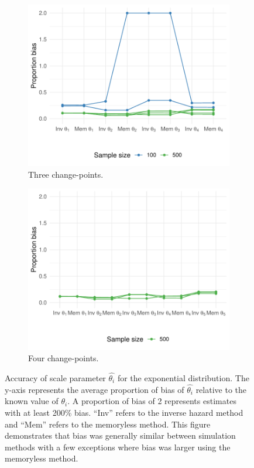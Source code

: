 \begin{appendix}
\begin{figure}[ht]
     \begin{subfigure}[b]{0.45\textwidth}
         \centering
         \includegraphics[width=\textwidth]{exp3_tplot.pdf}
         \caption{Three change-points.}
         \label{fig:exp3tplot}
     \end{subfigure}
     \hfill
     \begin{subfigure}[b]{0.45\textwidth}
         \centering
         \includegraphics[width=\textwidth]{exp4_tplot.pdf}
         \caption{Four change-points.}
         \label{fig:exp4tplot}
     \end{subfigure}
    \caption{Accuracy of scale parameter $\hat{\theta_i}$ for the exponential distribution. The y-axis represents the average proportion of bias of $\hat{\theta_i}$ relative to the known value of $\theta_i$. A proportion of bias of 2 represents estimates with at least 200\% bias. ``Inv'' refers to the inverse hazard method and ``Mem'' refers to the memoryless method. This figure demonstrates that bias was generally similar between simulation methods with a few exceptions where bias was larger using the memoryless method.}
    \label{fig:exptplots}
\end{figure}


\end{appendix}
